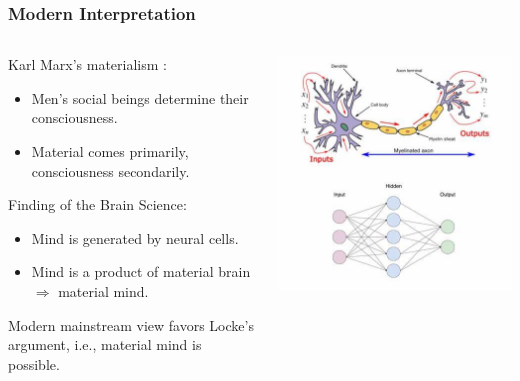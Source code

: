 \documentclass{beamer}
\begin{document}
\begin{frame}
    \frametitle{Modern Interpretation}
    \begin{columns}
        \begin{column}{.6\textwidth}
            Karl Marx's materialism \cite{marx-1932}:
            \begin{itemize}
                \item Men's social beings determine their consciousness.
                \item Material comes primarily, consciousness secondarily.
            \end{itemize}
            Finding of the Brain Science:
            \begin{itemize}
                \item Mind is generated by neural cells.
                \item Mind is a product of material brain \\ $\Rightarrow$ material mind.
            \end{itemize}
            Modern mainstream view favors Locke's argument, i.e., material mind is possible.
        \end{column}
        \begin{column}{.4\textwidth}
            \centering
            \includegraphics[width=1\textwidth]{img/nerual.jpeg}
        \end{column}
    \end{columns}
\end{frame}
\end{document}
